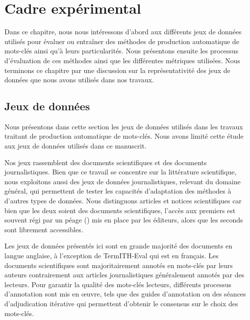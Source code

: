 \chapter{Cadre expérimental}\label{chap:framework}

Dans ce chapitre, nous nous intéressons d'abord aux différents jeux de données utilisés pour évaluer ou entraîner des méthodes de production automatique de mots-clés ainsi qu'à leurs particularités.
Nous présentons ensuite les processus d'évaluation de ces méthodes ainsi que les différentes métriques utilisées. Nous terminons ce chapitre par une discussion sur la représentativité des jeux de données que nous avons utilisés dans nos travaux.



\section{Jeux de données} \label{sec:framework_datasets}

Nous présentons dans cette section les jeux de données utilisés dans les travaux traitant de production automatique de mots-clés.
Nous avons limité cette étude aux jeux de données utilisés dans ce manuscrit.

Nos jeux rassemblent des documents scientifiques et des documents journalistiques. 
Bien que ce travail se concentre sur la littérature scientifique, nous exploitons aussi des jeux de données journalistiques, relevant du domaine général, qui permettent de tester les capacités d'adaptation des méthodes à d'autres types de données.
Nous distinguons articles et notices scientifiques car bien que les deux soient des documents scientifiques, l'accès aux premiers est souvent régi par un péage () mis en place par les éditeurs, alors que les seconds sont librement accessibles. 


Les jeux de données présentés ici sont en grande majorité des documents en langue anglaise, à l'exception de TermITH-Eval qui est en français.
Les documents scientifiques sont majoritairement annotés en mots-clés par leurs auteurs contrairement aux articles journalistiques généralement annotés par des lecteurs.
Pour garantir la qualité des mots-clés lecteurs, différents processus d'annotation sont mis en \oe{}uvre, tels que des guides d'annotation ou des séances d'adjudication itérative qui permettent d'obtenir le consensus sur le choix des mots-clés.

